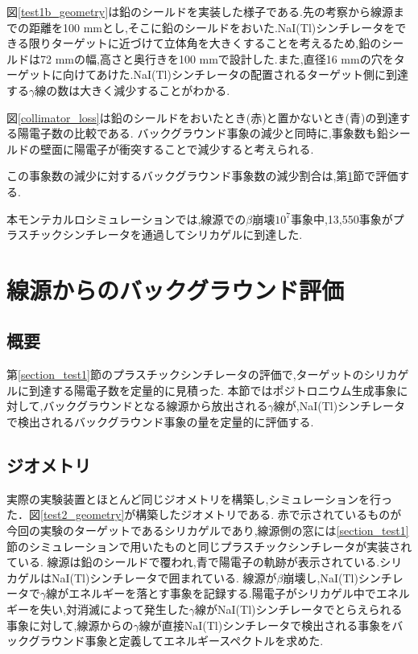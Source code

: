 図\ref{test1b_geometry}は鉛のシールドを実装した様子である.先の考察から線源までの距離を100 mmとし,そこに鉛のシールドをおいた.NaI(Tl)シンチレータをできる限りターゲットに近づけて立体角を大きくすることを考えるため,鉛のシールドは72 mmの幅,高さと奥行きを100 mmで設計した.また,直径16 mmの穴をターゲットに向けてあけた.NaI(Tl)シンチレータの配置されるターゲット側に到達する$\gamma$線の数は大きく減少することがわかる.

図\ref{collimator_loss}は鉛のシールドをおいたとき(赤)と置かないとき(青)の到達する陽電子数の比較である.
バックグラウンド事象の減少と同時に,事象数も鉛シールドの壁面に陽電子が衝突することで減少すると考えられる.

この事象数の減少に対するバックグラウンド事象数の減少割合は,第\ref{section_test2}節で評価する.

本モンテカルロシミュレーションでは,線源での$\beta$崩壊$10^7$事象中,13,550事象がプラスチックシンチレータを通過してシリカゲルに到達した.



\section{線源からのバックグラウンド評価}
\label{section_test2}

\subsection{概要}
第\ref{section_test1}節のプラスチックシンチレータの評価で,ターゲットのシリカゲルに到達する陽電子数を定量的に見積った.
本節ではポジトロニウム生成事象に対して,バックグラウンドとなる線源から放出される$\gamma$線が,NaI(Tl)シンチレータで検出されるバックグラウンド事象の量を定量的に評価する.


\subsection{ジオメトリ}
実際の実験装置とほとんど同じジオメトリを構築し,シミュレーションを行った．図\ref{test2_geometry}が構築したジオメトリである.
赤で示されているものが今回の実験のターゲットであるシリカゲルであり,線源側の窓には\ref{section_test1}節のシミュレーションで用いたものと同じプラスチックシンチレータが実装されている.
線源は鉛のシールドで覆われ,青で陽電子の軌跡が表示されている.シリカゲルはNaI(Tl)シンチレータで囲まれている.
線源が$\beta$崩壊し,NaI(Tl)シンチレータで$\gamma$線がエネルギーを落とす事象を記録する.陽電子がシリカゲル中でエネルギーを失い,対消滅によって発生した$\gamma$線がNaI(Tl)シンチレータでとらえられる事象に対して,線源からの$\gamma$線が直接NaI(Tl)シンチレータで検出される事象をバックグラウンド事象と定義してエネルギースペクトルを求めた.

